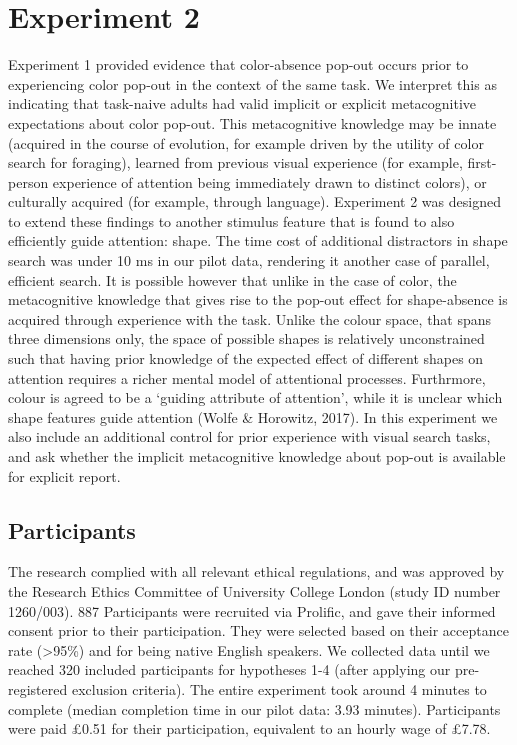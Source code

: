 \documentclass[12pt,twoside]{reedthesis}
\begin{document}
\hypertarget{experiment-2}{%
\section{Experiment 2}\label{experiment-2}}

Experiment 1 provided evidence that color-absence pop-out occurs prior to experiencing color pop-out in the context of the same task. We interpret this as indicating that task-naive adults had valid implicit or explicit metacognitive expectations about color pop-out. This metacognitive knowledge may be innate (acquired in the course of evolution, for example driven by the utility of color search for foraging), learned from previous visual experience (for example, first-person experience of attention being immediately drawn to distinct colors), or culturally acquired (for example, through language). Experiment 2 was designed to extend these findings to another stimulus feature that is found to also efficiently guide attention: shape. The time cost of additional distractors in shape search was under 10 ms in our pilot data, rendering it another case of parallel, efficient search. It is possible however that unlike in the case of color, the metacognitive knowledge that gives rise to the pop-out effect for shape-absence is acquired through experience with the task. Unlike the colour space, that spans three dimensions only, the space of possible shapes is relatively unconstrained such that having prior knowledge of the expected effect of different shapes on attention requires a richer mental model of attentional processes. Furthrmore, colour is agreed to be a `guiding attribute of attention', while it is unclear which shape features guide attention (Wolfe \& Horowitz, 2017). In this experiment we also include an additional control for prior experience with visual search tasks, and ask whether the implicit metacognitive knowledge about pop-out is available for explicit report.

\hypertarget{participants-1}{%
\subsection{Participants}\label{participants-1}}

The research complied with all relevant ethical regulations, and was approved by the Research Ethics Committee of University College London (study ID number 1260/003). 887 Participants were recruited via Prolific, and gave their informed consent prior to their participation. They were selected based on their acceptance rate (\textgreater95\%) and for being native English speakers. We collected data until we reached 320 included participants for hypotheses 1-4 (after applying our pre-registered exclusion criteria). The entire experiment took around 4 minutes to complete (median completion time in our pilot data: 3.93 minutes). Participants were paid £0.51 for their participation, equivalent to an hourly wage of £7.78.
\end{document}
